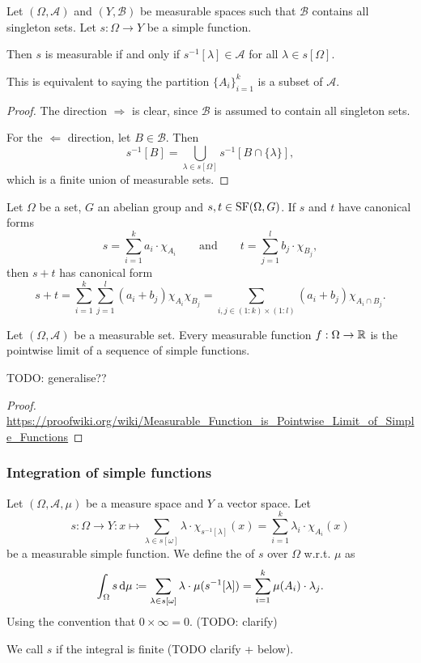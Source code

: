 \begin{lemma}
Let $(\Omega, \mathcal{A})$ and $(Y, \mathcal{B})$ be measurable spaces such that $\mathcal{B}$ contains all singleton sets. Let $s:\Omega\to Y$ be a simple function.

Then $s$ is measurable \textup{if and only if} $s^{-1}[\lambda]\in\mathcal{A}$ for all $\lambda\in s[\Omega]$.

This is equivalent to saying the partition $\{A_i\}_{i=1}^k$ is a subset of $\mathcal{A}$.
\end{lemma}
\begin{proof}
The direction $\boxed{\Rightarrow}$ is clear, since $\mathcal{B}$ is assumed to contain all singleton sets.

For the $\boxed{\Leftarrow}$ direction, let $B\in \mathcal{B}$. Then
\[ s^{-1}[B] = \bigcup_{\lambda\in s[\Omega]}s^{-1}[B\cap \{\lambda\}], \]
which is a finite union of measurable sets.
\end{proof}

\begin{lemma}
Let $\Omega$ be a set, $G$ an abelian group and $s,t\in\operatorname{SF}(\Omega,G)$. If $s$ and $t$ have canonical forms
\[ s = \sum_{i=1}^k a_i\cdot\chi_{A_i} \qquad\text{and}\qquad t = \sum_{j=1}^l b_j\cdot\chi_{B_j}, \]
then $s+t$ has canonical form
\[ s+t = \sum_{i=1}^k\sum_{j=1}^l (a_i+b_j)\chi_{A_i}\chi_{B_j} = \sum_{i,j \in (1:k)\times(1:l)}(a_i+b_j)\chi_{A_i\cap B_j}. \]
\end{lemma}

\begin{proposition}
Let $(\Omega,\mathcal{A})$ be a measurable set. Every measurable function $f:\Omega\to \mathbb{R}$ is the pointwise limit of a sequence of simple functions.
\end{proposition}
TODO: generalise??
\begin{proof}
\url{https://proofwiki.org/wiki/Measurable_Function_is_Pointwise_Limit_of_Simple_Functions}
\end{proof}

\subsubsection{Integration of simple functions}
\begin{definition}
Let $(\Omega, \mathcal{A}, \mu)$ be a measure space and $Y$ a vector space. Let
\[ s:\Omega \to Y: x\mapsto \sum_{\lambda \in s[\omega]}\lambda\cdot \chi_{s^{-1}[\lambda]}(x) = \sum_{i=1}^k\lambda_i\cdot\chi_{A_i}(x)  \]
be a measurable simple function. We define the  of $s$ over $\Omega$ w.r.t. $\mu$ as
\[ \int_\Omega s\operatorname{d \!}{\mu} \coloneqq \sum_{\lambda \in s[\omega]}\lambda\cdot \mu(s^{-1}[\lambda]) = \sum_{i=1}^k\mu(A_i)\cdot\lambda_j. \]
Using the convention that $0\times \infty = 0$. (TODO: clarify)

We call $s$  if the integral is finite (TODO clarify + below).
\end{definition}

